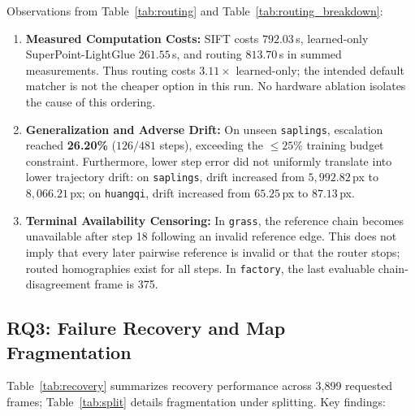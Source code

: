 \documentclass[conference]{IEEEtran}
\begin{document}
Observations from Table~\ref{tab:routing} and Table~\ref{tab:routing_breakdown}:
\begin{enumerate}\setlength{\itemsep}{1.5pt}\setlength{\parskip}{0pt}
    \item \textbf{Measured Computation Costs:} SIFT costs $792.03$\,s, learned-only SuperPoint-LightGlue $261.55$\,s, and routing $813.70$\,s in summed measurements. Thus routing costs $3.11\times$ learned-only; the intended default matcher is not the cheaper option in this run. No hardware ablation isolates the cause of this ordering.
    \item \textbf{Generalization and Adverse Drift:} On unseen \texttt{saplings}, escalation reached \textbf{26.20\%} ($126/481$ steps), exceeding the $\le 25\%$ training budget constraint. Furthermore, lower step error did not uniformly translate into lower trajectory drift: on \texttt{saplings}, drift increased from $5{,}992.82$\,px to $8{,}066.21$\,px; on \texttt{huangqi}, drift increased from $65.25$\,px to $87.13$\,px.
    \item \textbf{Terminal Availability Censoring:} In \texttt{grass}, the reference chain becomes unavailable after step 18 following an invalid reference edge. This does not imply that every later pairwise reference is invalid or that the router stops; routed homographies exist for all steps. In \texttt{factory}, the last evaluable chain-disagreement frame is 375.
\end{enumerate}

\subsection{RQ3: Failure Recovery and Map Fragmentation}
\label{subsec:rq3_results}

Table~\ref{tab:recovery} summarizes recovery performance across 3,899 requested frames; Table~\ref{tab:split} details fragmentation under splitting. Key findings:

\begin{table}[h]
\centering
\caption{Downstream Failure Recovery Performance (3,899 Frames)}
\label{tab:recovery}
\footnotesize

\end{table}

\begin{table}[b]
\centering
\caption{Detailed Submosaic Fragmentation Profile Under the Split Policy}
\label{tab:split}
\footnotesize

\end{table}
\end{document}
